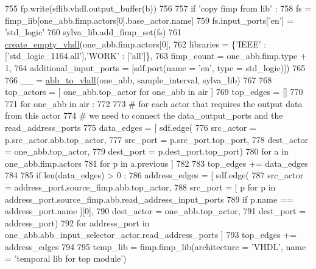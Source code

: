 \begin{DoxyCode}
755               fp.write(sflib.vhdl.output\_buffer(b))
756 
757       \textcolor{keywordflow}{if} \textcolor{stringliteral}{'copy fimp from lib'} :
758         fs = fimp\_lib[one\_abb.fimp.actors[0].base\_actor.name]
759         fs.input\_ports[\textcolor{stringliteral}{'en'}] = \textcolor{stringliteral}{'std\_logic'}
760         sylva\_lib.add\_fimp\_set(fs)
761         \hyperlink{namespacesylva_1_1code__generation_1_1hsdf__to__vhdl_a34788575516a0c7731b0e5abd4d42231}{create\_empty\_vhdl}(one\_abb.fimp.actors[0],
762           libraries = \{\textcolor{stringliteral}{'IEEE'} : [\textcolor{stringliteral}{'std\_logic\_1164.all'}],\textcolor{stringliteral}{'WORK'} : [\textcolor{stringliteral}{'all'}]\},
763           fimp\_count = one\_abb.fimp.type + 1,
764           additional\_input\_ports = [sdf.port(name = \textcolor{stringliteral}{'en'}, type = std\_logic)])
765 
766     \_\_ = \hyperlink{namespacesylva_1_1code__generation_1_1air_a353257c84de380833218457a45c3f2a3}{abb\_to\_vhdl}(one\_abb, sample\_interval, sylva\_lib)
767 
768   top\_actors = [ one\_abb.top\_actor \textcolor{keywordflow}{for} one\_abb \textcolor{keywordflow}{in} air ]
769   top\_edges = []
770 
771   \textcolor{keywordflow}{for} one\_abb \textcolor{keywordflow}{in} air :
772 
773     \textcolor{comment}{# for each actor that requires the output data from this actor}
774     \textcolor{comment}{# we need to connect the data\_output\_ports and the read\_address\_ports}
775     data\_edges = [ sdf.edge(
776       src\_actor = p.src\_actor.abb.top\_actor,
777       src\_port = p.src\_port.top\_port,
778       dest\_actor = one\_abb.top\_actor,
779       dest\_port = p.dest\_port.top\_port)
780       \textcolor{keywordflow}{for} a \textcolor{keywordflow}{in} one\_abb.fimp.actors
781         \textcolor{keywordflow}{for} p \textcolor{keywordflow}{in} a.previous ]
782 
783     top\_edges += data\_edges
784 
785     \textcolor{keywordflow}{if} len(data\_edges) > 0 :
786       address\_edges = [ sdf.edge(
787         src\_actor = address\_port.source\_fimp.abb.top\_actor,
788         src\_port = [ p \textcolor{keywordflow}{for} p \textcolor{keywordflow}{in} address\_port.source\_fimp.abb.read\_address\_input\_ports
789           \textcolor{keywordflow}{if} p.name == address\_port.name ][0],
790         dest\_actor = one\_abb.top\_actor,
791         dest\_port = address\_port)
792         \textcolor{keywordflow}{for} address\_port \textcolor{keywordflow}{in} one\_abb.abb\_input\_selector\_actor.read\_address\_ports ]
793       top\_edges += address\_edges
794 
795   temp\_lib = fimp.fimp\_lib(architecture = \textcolor{stringliteral}{'VHDL'}, name = \textcolor{stringliteral}{'temporal lib for top module'})

\end{DoxyCode}

